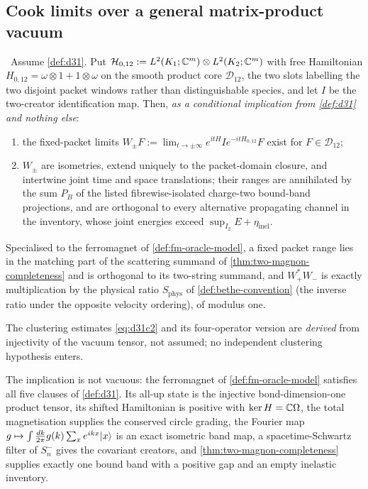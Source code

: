 \subsection{Cook limits over a general matrix-product vacuum}

\begin{theorem}
\label{thm:ac-ex-2m}
\statusProvedConditional\ Assume \cref{def:d31}. Put
$\mathcal{H}_{0,12}:=L^2(K_1;\mathbb{C}^m)\otimes L^2(K_2;\mathbb{C}^m)$ with free Hamiltonian
$H_{0,12}=\omega\otimes1+1\otimes\omega$ on the smooth product core
$\mathcal{D}_{12}$, the two slots labelling the two disjoint packet windows
rather than distinguishable species, and let $I$ be the two-creator
identification map. Then, \emph{as a conditional implication from
\cref{def:d31} and nothing else}:
\begin{enumerate}
\item[(i)] the fixed-packet limits
  $W_\pm F:=\lim_{t\to\pm\infty}e^{itH}Ie^{-itH_{0,12}}F$ exist for
  $F\in\mathcal{D}_{12}$;
\item[(ii)] $W_\pm$ are isometries, extend uniquely to the packet-domain
  closure, and intertwine joint time and space translations; their ranges are
  annihilated by the sum $P_B$ of the listed fibrewise-isolated charge-two
  bound-band projections, and are orthogonal to every alternative propagating
  channel in the inventory, whose joint energies exceed
  $\sup_{I_2}E+\eta_{\mathrm{inel}}$.
\end{enumerate}
Specialised to the ferromagnet of \cref{def:fm-oracle-model}, a fixed packet
range lies in the matching part of the scattering summand of
\cref{thm:two-magnon-completeness} and is orthogonal to its two-string
summand, and $W_+^{*}W_-$ is exactly multiplication by the physical ratio
$S_{\mathrm{phys}}$ of \cref{def:bethe-convention} (the inverse ratio under
the opposite velocity ordering), of modulus one.

The clustering estimates \cref{eq:d31c2} and its four-operator version are
\emph{derived} from injectivity of the vacuum tensor, not assumed; no
independent clustering hypothesis enters.

The implication is not vacuous: the ferromagnet of
\cref{def:fm-oracle-model} satisfies all five clauses of \cref{def:d31}. Its
all-up state is the injective bond-dimension-one product tensor, its shifted
Hamiltonian is positive with $\ker H=\mathbb{C}\Omega$, the total magnetisation
supplies the conserved circle grading, the Fourier map
$g\mapsto\int\frac{dk}{2\pi}g(k)\sum_xe^{ikx}|x\rangle$ is an exact isometric
band map, a spacetime-Schwartz filter of $S^-_n$ gives the covariant creators,
and \cref{thm:two-magnon-completeness} supplies exactly one bound band with a
positive gap and an empty inelastic inventory.
\end{theorem}
